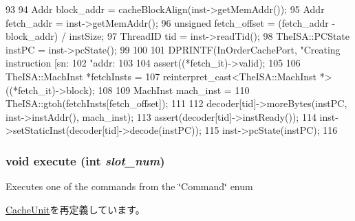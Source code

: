 \begin{DoxyCode}
93 {
94     Addr block_addr = cacheBlockAlign(inst->getMemAddr());
95     Addr fetch_addr = inst->getMemAddr();
96     unsigned fetch_offset = (fetch_addr - block_addr) / instSize;
97     ThreadID tid = inst->readTid();
98     TheISA::PCState instPC = inst->pcState();
99 
100 
101     DPRINTF(InOrderCachePort, "Creating instruction [sn:%
102             "addr:%
103 
104     assert((*fetch_it)->valid);
105 
106     TheISA::MachInst *fetchInsts =
107         reinterpret_cast<TheISA::MachInst *>((*fetch_it)->block);
108 
109     MachInst mach_inst =
110         TheISA::gtoh(fetchInsts[fetch_offset]);
111 
112     decoder[tid]->moreBytes(instPC, inst->instAddr(), mach_inst);
113     assert(decoder[tid]->instReady());
114     inst->setStaticInst(decoder[tid]->decode(instPC));
115     inst->pcState(instPC);
116 }
\end{DoxyCode}
\hypertarget{classFetchUnit_a7b7fff82f8c9cbdb02add1346f60bb9e}{
\subsubsection[{execute}]{\setlength{\rightskip}{0pt plus 5cm}void execute (int {\em slot\_\-num})}}
\label{classFetchUnit_a7b7fff82f8c9cbdb02add1346f60bb9e}
Executes one of the commands from the \char`\"{}Command\char`\"{} enum 

\hyperlink{classCacheUnit_a7b7fff82f8c9cbdb02add1346f60bb9e}{CacheUnit}を再定義しています。


